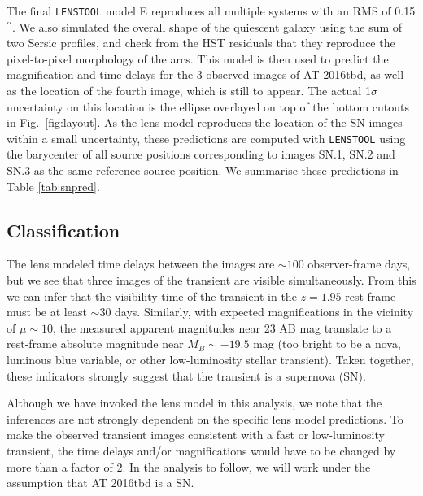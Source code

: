 \documentclass[12pt]{article}
\gdef\arcsec{$^{\prime\prime}$}
\def\SNABC{AT 2016tbd\xspace}
\def\lenstool{{\tt LENSTOOL}\xspace}
\begin{document}
The final \lenstool model E reproduces all multiple systems with an RMS of 0.15\arcsec. We also simulated the overall shape of the quiescent galaxy using the sum of two Sersic profiles, and check from the HST residuals that they reproduce the pixel-to-pixel morphology of the arcs. This model is then used to predict the magnification and time delays for the 3 observed images of \SNABC, as well as the location of the fourth  image, which is still to appear. The actual 1$\sigma$ uncertainty on this location is the ellipse overlayed on top of the bottom cutouts in Fig.~\ref{fig:layout}. As the lens model reproduces the location of the SN images within a small uncertainty, these predictions are computed with \lenstool using the barycenter of all source positions corresponding to images SN.1, SN.2 and SN.3 as the same reference source position. We summarise these predictions in Table \ref{tab:snpred}.



\subsection*{Classification}

The lens modeled time delays between the images are $\sim100$ observer-frame days, 
but we see that three images of the transient are visible simultaneously.
From this we can infer that the visibility time of the transient in the $z=1.95$ rest-frame must be at least $\sim$30 days. 
Similarly, with expected magnifications in the vicinity of $\mu\sim10$, the measured apparent magnitudes near 23 AB mag translate to a rest-frame absolute magnitude near $M_B \sim-19.5$ mag (too bright to be a nova, luminous blue variable, or other low-luminosity stellar transient).
Taken together, these indicators strongly suggest that the transient is a supernova (SN). 

Although we have invoked the lens model in this analysis, we note that the inferences are not strongly dependent on the specific lens model predictions.  To make the observed transient images consistent with a fast or low-luminosity transient, the time delays and/or magnifications would have to be changed by more than a factor of 2.  In the analysis to follow, we will work under the assumption that \SNABC is a SN. 
\end{document}
